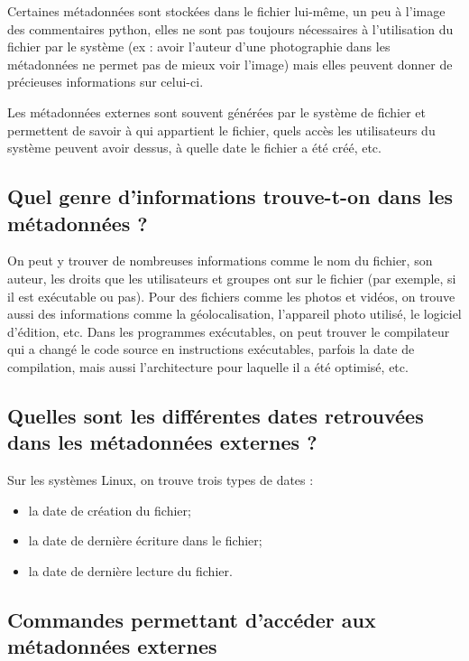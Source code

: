 \documentclass[a4paper]{article}
\begin{document}
Certaines métadonnées sont stockées dans le fichier lui-même, un peu à l'image des commentaires python, elles ne sont pas toujours nécessaires à l'utilisation du fichier par le système (ex : avoir l'auteur d'une photographie dans les métadonnées ne permet pas de mieux voir l'image) mais elles peuvent donner de précieuses informations sur celui-ci.

Les métadonnées externes sont souvent générées par le système de fichier et permettent de savoir à qui appartient le fichier, quels accès les utilisateurs du système peuvent avoir dessus, à quelle date le fichier a été créé, etc.




\subsection{Quel genre d'informations trouve-t-on dans les métadonnées ?}

On peut y trouver de nombreuses informations comme le nom du fichier, son auteur, les droits que les utilisateurs et groupes ont sur le fichier (par exemple, si il est exécutable ou pas). Pour des fichiers comme les photos et vidéos, on trouve aussi des informations comme la géolocalisation, l'appareil photo utilisé, le logiciel d'édition, etc. Dans les programmes exécutables, on peut trouver le compilateur qui a changé le code source en instructions exécutables, parfois la date de compilation, mais aussi l'architecture pour laquelle il a été optimisé, etc.





\subsection{Quelles sont les différentes dates retrouvées dans les métadonnées externes ?}

Sur les systèmes Linux, on trouve trois types de dates :
\begin{itemize}
    \item la date de création du fichier;
    \item la date de dernière écriture dans le fichier;
    \item la date de dernière lecture du fichier.
\end{itemize}





\subsection{Commandes permettant d'accéder aux métadonnées externes}
\end{document}
